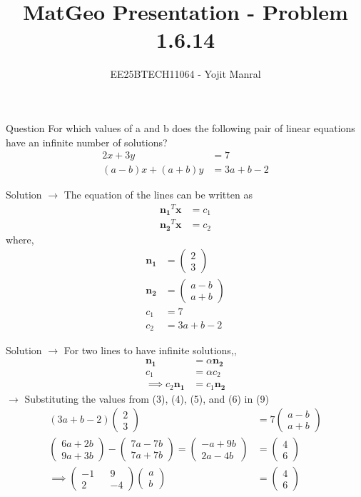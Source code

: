 \documentclass{beamer}
\title{MatGeo Presentation - Problem 1.6.14}
\author{EE25BTECH11064 - Yojit Manral}
\date{}
\numberwithin{equation}{section}
\theoremstyle{remark}
\newcommand{\myvec}[1]{\ensuremath{\begin{pmatrix}#1\end{pmatrix}}}
\let\vec\mathbf
\begin{document}
\frame{\titlepage}
\begin{frame}{Question}
For which values of a and b does the following pair of linear equations have an infinite number of solutions?
\begin{align*}
    2x + 3y &= 7 \\
    (a - b)x + (a + b)y &= 3a + b - 2
\end{align*}
\end{frame}

\begin{frame}{Solution}
$\rightarrow$ The equation of the lines can be written as
\begin{align}
    \vec{n_1}^{T}\vec{x} &= c_1 \\
    \vec{n_2}^{T}\vec{x} &= c_2
\end{align}
\hspace{0.3cm} where,
\begin{align}
    \vec{n_1} &= \myvec{2\\3} \\
    \vec{n_2} &= \myvec{a-b\\a+b} \\
    c_1 &= 7 \\
    c_2 &= 3a + b -2
\end{align}
\end{frame}

\begin{frame}{Solution}
$\rightarrow$ For two lines to have infinite solutions,,
\begin{align}
    \vec{n_1} &= \alpha \vec{n_2} \\
    c_1 &= \alpha c_2 \\
    \implies c_2 \vec{n_1} &= c_1 \vec{n_2}
\end{align}
$\rightarrow$ Substituting the values from (3), (4), (5), and (6) in (9)
\begin{align}
    (3a + b - 2)\myvec{2\\3} &= 7 \myvec{a-b\\a+b} \\
    \myvec{6a + 2b\\9a + 3b} - \myvec{7a-7b\\7a+7b} = \myvec{-a + 9b\\2a - 4b} &= \myvec{4\\6} \\
    \implies \myvec{-1&&9\\2&&-4}\myvec{a\\b} &= \myvec{4\\6}
\end{align}
\end{frame}
\end{document}
